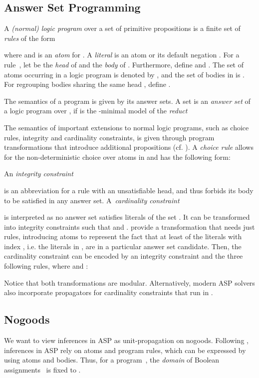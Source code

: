 \documentclass{tlp}
\begin{document}
\subsection{Answer Set Programming}

A \emph{(normal) logic program} over a set of primitive propositions  is a finite set of \emph{rules} of the form

where  and  is an \emph{atom} for .
A \emph{literal}  is an atom  or its default negation .
For a rule~, let  be the \emph{head} of  and  the \emph{body} of . Furthermore, define  and . The set of atoms occurring in a logic program  is denoted by , and the set of bodies in  is . For regrouping bodies sharing the same head , define .

The semantics of a program is given by its answer sets. A set  is an \emph{answer set} of a logic program  over , if  is the -minimal model of the \emph{reduct} \cite{gellif88b}

The semantics of important extensions to normal logic programs, such as choice rules, integrity and cardinality constraints, is given through program transformations that introduce additional propositions (cf. ).
A \emph{choice rule} allows for the non-deterministic choice over atoms in  and has the following form:

An \emph{integrity constraint}

is an abbreviation for a rule with an unsatisfiable head, and thus forbids its body to be satisfied in any answer set.
A~\emph{cardinality constraint}

is interpreted as no answer set satisfies  literals of the set . It can be transformed into  integrity constraints  such that  and .
 provide a transformation that needs just  rules, introducing atoms  to represent the fact that at least  of the literals with index , i.e. the literals in ,
 are in a particular answer set candidate. Then, the cardinality constraint can be encoded by an integrity constraint  and the three following rules, where  and :

Notice that both transformations are modular. Alternatively, modern ASP solvers also incorporate propagators for cardinality constraints that run in .

\subsection{Nogoods}

We want to view inferences in ASP as unit-propagation on nogoods. 
Following , inferences in ASP rely on atoms and program rules, which can be expressed by using atoms and bodies. Thus, for a program~, the \emph{domain} of Boolean assignments~ is fixed to .
\end{document}

